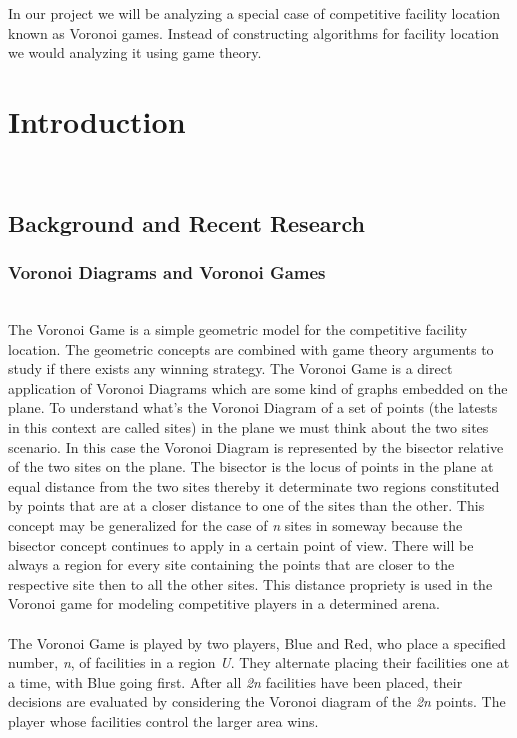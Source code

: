 \documentclass[12pt]{article}
\begin{document}
\indent In our project we will be analyzing a special case of competitive facility location known as Voronoi games. Instead of constructing algorithms for facility location we would analyzing it using game theory.
\\
\newpage 


\section{Introduction}\\

\subsection{Background and Recent Research }

\subsubsection{Voronoi Diagrams and Voronoi Games}\\

\indent \indent The Voronoi Game is a simple geometric model for the competitive facility location. The geometric concepts are combined with game theory arguments to study if there exists any winning strategy. The Voronoi Game is a direct application of Voronoi Diagrams which are some kind of graphs embedded on the plane.\cite{Ahn03competitivefacility} To understand what's the Voronoi Diagram of a set of points (the latests in this context are called sites) in the plane we must think about the two sites scenario. In this case the Voronoi Diagram is represented by the bisector relative of the two sites on the plane. The bisector is the locus of points in the plane at equal distance from the two sites thereby it determinate two regions constituted by points that are at a closer distance to one of the sites than the other. This concept may be generalized for the case of \emph{n} sites in someway because the bisector concept continues to apply in a certain point of view. There will be always a region for every site containing the points that are closer to the respective site then to all the other sites. This distance propriety is used in the Voronoi game for modeling competitive players in a determined arena.\\\\
\indent The Voronoi Game is played by two players, Blue and Red, who place a specified number, \emph{n}, of facilities in a region \emph{U}. They alternate placing their facilities one at a time, with Blue going first. After all \emph{2n} facilities have been placed, their decisions are evaluated by considering the Voronoi diagram of the \emph{2n} points. The player whose facilities control the larger area wins.\\
\end{document}
